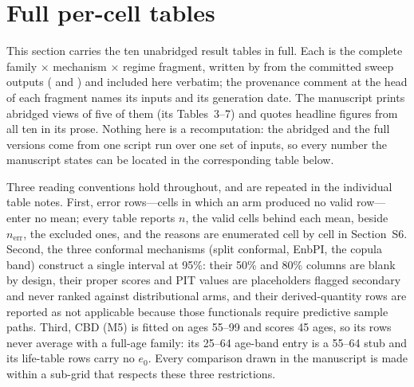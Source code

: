 %
%

\clearpage
\section{Full per-cell tables}
\label{sec:supp-tables}

This section carries the ten unabridged result tables in full. Each is the
complete family $\times$ mechanism $\times$ regime fragment, written by
 from the committed sweep outputs
( and ) and
included here verbatim; the provenance comment at the head of each fragment
names its inputs and its generation date. The manuscript prints abridged views
of five of them (its Tables~3--7) and quotes headline figures from all ten in
its prose. Nothing here is a recomputation: the abridged and the full versions
come from one script run over one set of inputs, so every number the manuscript
states can be located in the corresponding table below.

Three reading conventions hold throughout, and are repeated in the individual
table notes. First, error rows---cells in which an arm produced no valid
row---enter no mean; every table reports $n$, the valid cells behind each mean,
beside $n_{\mathrm{err}}$, the excluded ones, and the reasons are enumerated
cell by cell in Section~S6. Second, the three conformal mechanisms (split
conformal, EnbPI, the copula band) construct a single interval at 95\%: their
50\% and 80\% columns are blank by design, their proper scores and PIT values
are placeholders flagged secondary and never ranked against distributional
arms, and their derived-quantity rows are reported as not applicable because
those functionals require predictive sample paths. Third, CBD (M5) is fitted on
ages 55--99 and scores 45 ages, so its rows never average with a full-age
family: its 25--64 age-band entry is a 55--64 stub and its life-table rows
carry no $e_0$. Every comparison drawn in the manuscript is made within a
sub-grid that respects these three restrictions.

